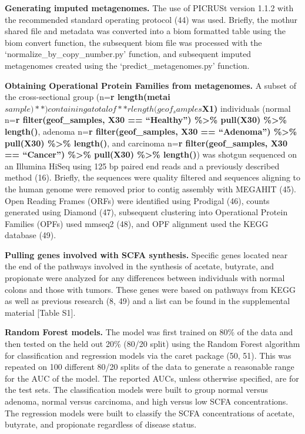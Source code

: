 \documentclass[11pt,]{article}
\begin{document}
\textbf{Generating imputed metagenomes.} The use of PICRUSt version
1.1.2 with the recommended standard operating protocol (44) was used.
Briefly, the mothur shared file and metadata was converted into a biom
formatted table using the biom convert function, the subsequent biom
file was processed with the `normalize\_by\_copy\_number.py' function,
and subsequent imputed metagenomes created using the
`predict\_metagenomes.py' function.

\textbf{Obtaining Operational Protein Families from metagenomes.} A
subset of the cross-sectional group (n=\textbf{r
length(metai\(sample)**) containing a total of **r length(geof_samples\)X1)}
individuals (normal n=\textbf{r filter(geof\_samples, X30 ==
``Healthy'') \%\textgreater{}\% pull(X30) \%\textgreater{}\% length()},
adenoma n=\textbf{r filter(geof\_samples, X30 == ``Adenoma'')
\%\textgreater{}\% pull(X30) \%\textgreater{}\% length()}, and carcinoma
n=\textbf{r filter(geof\_samples, X30 == ``Cancer'') \%\textgreater{}\%
pull(X30) \%\textgreater{}\% length()}) was shotgun sequenced on an
Illumina HiSeq using 125 bp paired end reads and a previously described
method (16). Briefly, the sequences were quality filtered and sequences
aligning to the human genome were removed prior to contig assembly with
MEGAHIT (45). Open Reading Frames (ORFs) were identified using Prodigal
(46), counts generated using Diamond (47), subsequent clustering into
Operational Protein Families (OPFs) used mmseq2 (48), and OPF alignment
used the KEGG database (49).

\textbf{Pulling genes involved with SCFA synthesis.} Specific genes
located near the end of the pathways involved in the synthesis of
acetate, butyrate, and propionate were analyzed for any differences
between individuals with normal colons and those with tumors. These
genes were based on pathways from KEGG as well as previous research (8,
49) and a list can be found in the supplemental material {[}Table S1{]}.

\textbf{Random Forest models.} The model was first trained on 80\% of
the data and then tested on the held out 20\% (80/20 split) using the
Random Forest algorithm for classification and regression models via the
caret package (50, 51). This was repeated on 100 different 80/20 splits
of the data to generate a reasonable range for the AUC of the model. The
reported AUCs, unless otherwise specified, are for the test sets. The
classification models were built to group normal versus adenoma, normal
versus carcinoma, and high versus low SCFA concentrations. The
regression models were built to classify the SCFA concentrations of
acetate, butyrate, and propionate regardless of disease status.
\end{document}
